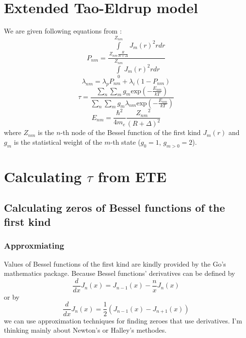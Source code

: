 \documentclass[a4paper]{article}
\begin{document}
	\section{Extended Tao-Eldrup model}
	We are given following equations from \cite{Zaleski2015}:
	\begin{equation}
		\label{eq1}
		P_{nm} = 
			\frac
				{\int\limits_{Z_{nm}\frac{R}{R+\Delta}}^{Z_{nm}}J_m(r)^2rdr}
				{\int\limits_0^{Z_{nm}}J_m(r)^2rdr}
	\end{equation}
	\begin{equation}
		\lambda_{nm} = \lambda_pP_{nm} + \lambda_i(1-P_{nm})
	\end{equation}
	\begin{equation}
		\tau =
			\frac
				{\sum\limits_n\sum\limits_mg_m\mathrm{exp}\left(-\frac{E_{nm}}{kT}\right)}
				{\sum\limits_n\sum\limits_mg_m\lambda_{nm}\mathrm{exp}\left(-\frac{E_{nm}}{kT}\right)}
	\end{equation}
	\begin{equation*}
		E_{nm} = \frac{\hbar^2}{4m_e}\frac{{Z_{nm}}^2}{(R+\Delta)^2}
	\end{equation*}
	where $Z_{nm}$ is the $n$-th node of the Bessel function of the
	first kind $J_m(r)$ and $g_m$ is the statistical weight of the $m$-th state
	($g_0 = 1$, $g_{m>0}=2$).
	\section{Calculating $\tau$ from ETE}
	\subsection{Calculating zeros of Bessel functions of the first kind}
	\subsubsection{Approxmiating}
	Values of Bessel functions of the first kind are
	kindly provided by the Go's mathematics package.
	Because Bessel functions' derivatives can be defined by 
	\begin{equation*}
		\frac{d}{dx}J_n(x) = J_{n-1}(x) - \frac{n}{x}J_n(x)
	\end{equation*}
	or by
	\begin{equation*}
		\frac{d}{dx}J_n(x) = \frac{1}{2}(J_{n-1}(x) - J_{n+1}(x))
	\end{equation*}
	we can use approximation techniques for finding zeroes that use derivatives.
	I'm thinking mainly about Newton's or Halley's methodes.
\end{document}
